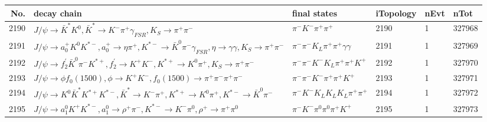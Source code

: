 \begin{table}[htbp] 
\begin{center}
\begin{small}
\begin{tabular}{rlllll}\hline\hline
 No. & decay chain & final states &  iTopology & nEvt & nTot \\\hline
2190&$J/\psi       \rightarrow \bar{K}^{*}   K^{0}          , \bar{K}^{*}    \rightarrow K^{-}          \pi^{+}        \gamma_{FSR} , K_{S}           \rightarrow \pi^{+}        \pi^{-}        $&$\pi^{-}        K^{-}          \pi^{+}        \pi^{+}        $& 2190&    1&327968\\
2191&$J/\psi       \rightarrow a_{0}^{+}      K^{0}          K^{*-}         , a_{0}^{+}       \rightarrow \eta          \pi^{+}        , K^{*-}          \rightarrow \bar{K}^{0}   \pi^{-}        \gamma_{FSR} , \eta           \rightarrow \gamma       \gamma       , K_{S}           \rightarrow \pi^{+}        \pi^{-}        $&$\pi^{-}        \pi^{-}        K_{L}          \pi^{+}        \pi^{+}        \gamma       \gamma       $& 2191&    1&327969\\
2192&$J/\psi       \rightarrow f_2^{'}       \bar{K}^{0}   \pi^{-}        K^{*+}         , f_2^{'}        \rightarrow K^{+}          K^{-}          , K^{*+}          \rightarrow K^{0}          \pi^{+}        , K_{S}           \rightarrow \pi^{+}        \pi^{-}        $&$\pi^{-}        \pi^{-}        K^{-}          K_{L}          \pi^{+}        \pi^{+}        K^{+}          $& 2192&    1&327970\\
2193&$J/\psi       \rightarrow \phi           f_{0}(1500)    , \phi            \rightarrow K^{+}          K^{-}          , f_{0}(1500)     \rightarrow \pi^{+}        \pi^{-}        \pi^{+}        \pi^{-}        $&$\pi^{-}        \pi^{-}        K^{-}          \pi^{+}        \pi^{+}        K^{+}          $& 2193&    1&327971\\
2194&$J/\psi       \rightarrow K^{0}          \bar{K}^{*}   K^{*+}         K^{*-}         , \bar{K}^{*}    \rightarrow K^{-}          \pi^{+}        , K^{*+}          \rightarrow K^{0}          \pi^{+}        , K^{*-}          \rightarrow \bar{K}^{0}   \pi^{-}        $&$\pi^{-}        K^{-}          K_{L}          K_{L}          K_{L}          \pi^{+}        \pi^{+}        $& 2194&    1&327972\\
2195&$J/\psi       \rightarrow a_{1}^{0}      K^{+}          K^{*-}         , a_{1}^{0}       \rightarrow \rho^{+}      \pi^{-}        , K^{*-}          \rightarrow K^{-}          \pi^{0}        , \rho^{+}       \rightarrow \pi^{+}        \pi^{0}        $&$\pi^{-}        K^{-}          \pi^{0}        \pi^{0}        \pi^{+}        K^{+}          $& 2195&    1&327973\\

\end{tabular}
\end{small}
\end{center}
\end{table}
